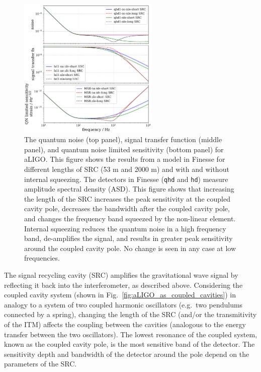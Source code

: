 \documentclass[aps,pra,superscriptaddress,reprint,nofootinbib]{revtex4-1}
\newcommand{\code}[1]{\texttt{#1}}
\begin{document}
\begin{figure}
	\begin{center}
	\includegraphics[width=0.6\textwidth]{figures/aLIGO_transfer_fns_and_sensitivity_comparison.pdf}
	\end{center}
	\caption{The quantum noise (top panel), signal transfer function (middle panel), and quantum noise limited sensitivity (bottom panel) for aLIGO. This figure shows the results from a model in Finesse for different lengths of SRC (53 m and 2000 m) and with and without internal squeezing. The detectors in Finesse (\code{qhd} and \code{hd}) measure amplitude spectral density (ASD). This figure shows that increasing the length of the SRC increases the peak sensitivity at the coupled cavity pole, decreases the bandwidth after the coupled cavity pole, and changes the frequency band squeezed by the non-linear element. Internal squeezing reduces the quantum noise in a high frequency band, de-amplifies the signal, and results in greater peak sensitivity around the coupled cavity pole. No change is seen in any case at low frequencies.}
	\label{fig:src_transfer_functions}
\end{figure}

The signal recycling cavity (SRC) amplifies the gravitational wave signal by reflecting it back into the interferometer, as described above.
Considering the coupled cavity system (shown in Fig.~\ref{fig:aLIGO_as_coupled_cavities}) in analogy to a system of two coupled harmonic oscillators (e.g.\ two pendulums connected by a spring), changing the length of the SRC (and/or the transmitivity of the ITM) affects the coupling between the cavities (analogous to the energy transfer between the two oscillators). The lowest resonance of the coupled system, known as the coupled cavity pole, is the most sensitive band of the detector. The sensitivity depth and bandwidth of the detector around the pole depend on the parameters of the SRC.
\end{document}
